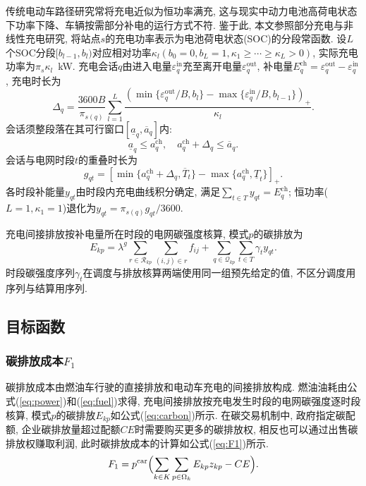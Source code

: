 \documentclass{setp-new}
\begin{document}
传统电动车路径研究常将充电近似为恒功率满充,
这与现实中动力电池高荷电状态下功率下降、车辆按需部分补电的运行方式不符.
鉴于此, 本文参照部分充电与非线性充电研究\cite{ref:45,ref:46},
将站点$s$的充电功率表示为电池荷电状态(SOC)的分段常函数.
设$L$个SOC分段$[b_{l-1},b_l)$对应相对功率$\kappa_l(b_0=0,b_L=1,\kappa_1\ge\cdots\ge\kappa_L>0)$,
实际充电功率为$\pi_s\kappa_l$~kW.
充电会话$q$由进入电量$\varepsilon_q^{\mathrm{in}}$充至离开电量$\varepsilon_q^{\mathrm{out}}$,
补电量$E_q^{\mathrm{ch}}=\varepsilon_q^{\mathrm{out}}-\varepsilon_q^{\mathrm{in}}$,
充电时长为
\begin{equation}
\Delta_q=\frac{3600 B}{\pi_{s(q)}}\sum_{l=1}^{L}
\frac{(\min\{\varepsilon_q^{\mathrm{out}}/B,b_l\}
-\max\{\varepsilon_q^{\mathrm{in}}/B,b_{l-1}\})_+}{\kappa_l}.
\label{eq:charge_duration}
\end{equation}
会话须整段落在其可行窗口$[\underline a_q,\overline a_q]$内:
\begin{equation}
\underline a_q\le a_q^{\mathrm{ch}},\quad a_q^{\mathrm{ch}}+\Delta_q\le\overline a_q.
\label{eq:charge_window}
\end{equation}
会话与电网时段$t$的重叠时长为
\begin{equation}
g_{qt}=[\min\{a_q^{\mathrm{ch}}+\Delta_q,\overline T_t\}-\max\{a_q^{\mathrm{ch}},\underline T_t\}]_+ .
\label{eq:charge_overlap}
\end{equation}
各时段补能量$y_{qt}$由时段内充电曲线积分确定, 满足$\sum_{t\in T}y_{qt}=E_q^{\mathrm{ch}}$;
恒功率($L=1,\kappa_1=1$)退化为$y_{qt}=\pi_{s(q)}g_{qt}/3600$.

充电间接排放按补电量所在时段的电网碳强度核算,
模式$p$的碳排放为
\begin{equation}
E_{kp}=\lambda^g\sum_{r\in\mathcal R_{kp}}\sum_{(i,j)\in r}f_{ij}
+\sum_{q\in\mathcal Q_{kp}}\sum_{t\in T}\gamma_t y_{qt}.
\label{eq:carbon}
\end{equation}
时段碳强度序列$\gamma_t$在调度与排放核算两端使用同一组预先给定的值,
不区分调度用序列与结算用序列.

\subsection{目标函数}

\subsubsection{碳排放成本\texorpdfstring{$F_1$}{F1}}
碳排放成本由燃油车行驶的直接排放和电动车充电的间接排放构成.
燃油油耗由公式(\ref{eq:power})和(\ref{eq:fuel})求得,
充电间接排放按充电发生时段的电网碳强度逐时段核算,
模式$p$的碳排放$E_{kp}$如公式(\ref{eq:carbon})所示.
在碳交易机制中, 政府指定碳配额,
企业碳排放量超过配额$CE$时需要购买更多的碳排放权,
相反也可以通过出售碳排放权赚取利润, 此时碳排放成本的计算如公式(\ref{eq:F1})所示.
\begin{equation}
F_1=p^{\mathrm{car}}\Bigl(\sum_{k\in K}\sum_{p\in\Omega_k}E_{kp}z_{kp}-CE\Bigr).
\label{eq:F1}
\end{equation}
\end{document}
